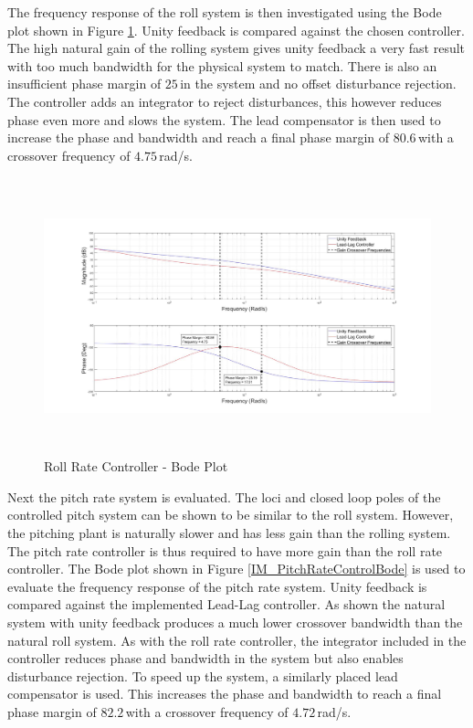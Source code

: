 	The frequency response of the roll system is then investigated using the Bode plot shown in Figure \ref{IM_RollRateControlBode}. Unity feedback is compared against the chosen controller. The high natural gain of the rolling system gives unity feedback a very fast result with too much bandwidth for the physical system to match. There is also an insufficient phase margin of $25$\textdegree\,in the system and no offset disturbance rejection. The controller adds an integrator to reject disturbances, this however reduces phase even more and slows the system. The lead compensator is then used to increase the phase and bandwidth and reach a final phase margin of $80.6$\textdegree\,with a crossover frequency of $4.75$\,rad/s.
	
	\begin{figure}[H]
		\centering
		\includegraphics[height = 8cm]{../Design/Matlab/Controllers/roll_rate_bode.jpg}
		\caption{Roll Rate Controller -  Bode Plot}
		\label{IM_RollRateControlBode}
	\end{figure}
	
	Next the pitch rate system is evaluated. The loci and closed loop poles of the controlled pitch system can be shown to be similar to the roll system. However, the pitching plant is naturally slower and has less gain than the rolling system. The pitch rate controller is thus required to have more gain than the roll rate controller. The Bode plot shown in Figure \ref{IM_PitchRateControlBode} is used to evaluate the frequency response of the pitch rate system. Unity feedback is compared against the implemented Lead-Lag controller. As shown the natural system with unity feedback produces a much lower crossover bandwidth than the natural roll system. As with the roll rate controller, the integrator included in the controller reduces phase and bandwidth in the system but also enables disturbance rejection. To speed up the system, a similarly placed lead compensator is used. This increases the phase and bandwidth to reach a final phase margin of $82.2$\textdegree\,with a crossover frequency of $4.72$\,rad/s.
	
